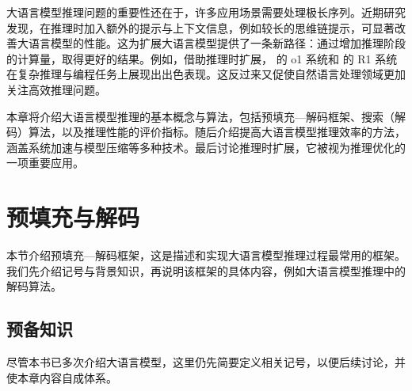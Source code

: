 大语言模型推理问题的重要性还在于，许多应用场景需要处理极长序列。近期研究发现，在推理时加入额外的提示与上下文信息，例如较长的思维链提示，可显著改善大语言模型的性能。这为扩展大语言模型提供了一条新路径：通过增加推理阶段的计算量，取得更好的结果。例如，借助推理时扩展，\citet{openai:2024learning} 的 o1 系统和 \citet{deepseek:2025r1} 的 R1 系统在复杂推理与编程任务上展现出出色表现。这反过来又促使自然语言处理领域更加关注高效推理问题。

本章将介绍大语言模型推理的基本概念与算法，包括预填充—解码框架、搜索（解码）算法，以及推理性能的评价指标。随后介绍提高大语言模型推理效率的方法，涵盖系统加速与模型压缩等多种技术。最后讨论推理时扩展，它被视为推理优化的一项重要应用。


\section{预填充与解码}

本节介绍预填充—解码框架，这是描述和实现大语言模型推理过程最常用的框架。我们先介绍记号与背景知识，再说明该框架的具体内容，例如大语言模型推理中的解码算法。

\subsection{预备知识}

尽管本书已多次介绍大语言模型，这里仍先简要定义相关记号，以便后续讨论，并使本章内容自成体系。

